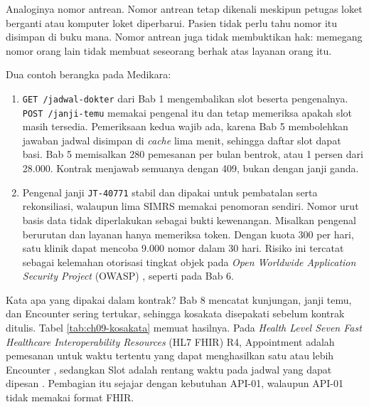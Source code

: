Analoginya nomor antrean. Nomor antrean tetap dikenali meskipun petugas loket berganti atau komputer loket diperbarui. Pasien tidak perlu
tahu nomor itu disimpan di buku mana. Nomor antrean juga tidak membuktikan hak: memegang nomor orang lain tidak membuat seseorang berhak
atas layanan orang itu.

Dua contoh berangka pada Medikara:
\begin{enumerate}
  \item \texttt{GET /jadwal-dokter} dari Bab 1 mengembalikan slot beserta pengenalnya. \texttt{POST /janji-temu} memakai pengenal itu dan
        tetap memeriksa apakah slot masih tersedia. Pemeriksaan kedua wajib ada, karena Bab 5 membolehkan jawaban jadwal disimpan di
        \textit{cache} lima menit, sehingga daftar slot dapat basi. Bab 5 memisalkan 280 pemesanan per bulan bentrok, atau 1 persen dari
        28.000. Kontrak menjawab semuanya dengan 409, bukan dengan janji ganda.
  \item Pengenal janji \texttt{JT-40771} stabil dan dipakai untuk pembatalan serta rekonsiliasi, walaupun lima SIMRS memakai penomoran
        sendiri. Nomor urut basis data tidak diperlakukan sebagai bukti kewenangan. Misalkan pengenal berurutan dan layanan hanya memeriksa
        token. Dengan kuota 300 per hari, satu klinik dapat mencoba 9.000 nomor dalam 30 hari. Risiko ini tercatat sebagai kelemahan
        otorisasi tingkat objek pada \textit{Open Worldwide Application Security Project} (OWASP) \cite{owasp-api1}, seperti pada Bab 6.
\end{enumerate}

Kata apa yang dipakai dalam kontrak? Bab 8 mencatat kunjungan, janji temu, dan Encounter sering tertukar, sehingga kosakata disepakati
sebelum kontrak ditulis. Tabel \ref{tab:ch09-kosakata} memuat hasilnya. Pada \textit{Health Level Seven Fast Healthcare Interoperability Resources}
(HL7 FHIR) R4, Appointment adalah pemesanan untuk waktu tertentu yang
dapat menghasilkan satu atau lebih Encounter \cite{c09-fhir-appointment}, sedangkan Slot adalah rentang waktu pada jadwal yang dapat dipesan
\cite{c09-fhir-slot}. Pembagian itu sejajar dengan kebutuhan API-01, walaupun API-01 tidak memakai format FHIR.

